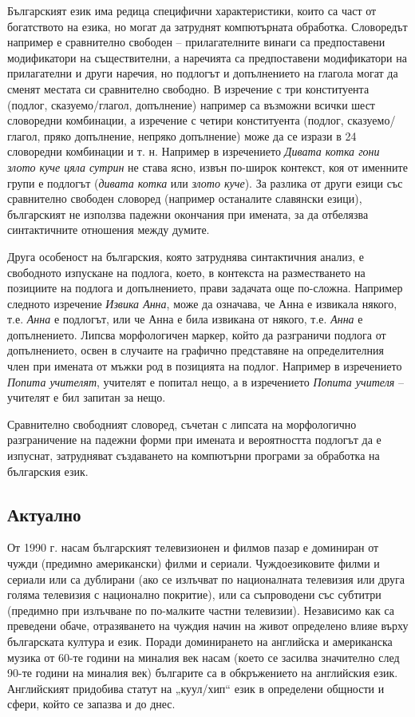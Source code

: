 \documentclass[]{../../metanetpaper}
\begin{document}
\begin{multicols}{2}
Българският език има редица специфични характеристики, които са част от богатството на езика, но могат
 да затруднят компютърната обработка. Словоредът например е
 сравнително свободен – прилагателните винаги са
 предпоставени модификатори на съществителни, а
 наречията
 са предпоставени
 модификатори
 на
 прилагателни и други наречия, но подлогът и
 допълнението на глагола могат да сменят местата си
 сравнително свободно. В изречение с три конституента
 (подлог, сказуемо/глагол, допълнение) например са
 възможни всички шест словоредни комбинации, а
 изречение
 с четири
 конституента
 (подлог,
 сказуемо/глагол,
 пряко допълнение,
 непряко
 допълнение) може да се изрази в 24 словоредни
 комбинации и т. н. Например в изречението \textit{Дивата
 котка гони злото куче цяла сутрин} не става ясно, извън
 по-широк контекст, коя от именните групи е подлогът
 (\textit{дивата котка} или  \textit{злото куче}). За разлика от други езици
 със сравнително свободен
 словоред
 (например
 останалите славянски езици), българският не използва
 падежни окончания при имената, за да отбелязва
 синтактичните отношения между думите.

Друга особеност на българския, която затруднява синтактичния анализ, е свободното изпускане на подлога, което, в контекста на разместването на позициите на подлога и допълнението, прави задачата
 още по-сложна. Например следното
 изречение \textit{Извика Анна}, може да означава, че
 Анна е извикала някого, т.е.  \textit{Анна} е подлогът, или че
 Анна е била извикана от някого, т.е.  \textit{Анна} е
 допълнението. Липсва морфологичен маркер, който да
 разграничи подлога от допълнението, освен в случаите
 на графично представяне на определителния член при имената от мъжки род в позицията на подлог. Например
 в изречението \textit{Попита учителят}, учителят е попитал
 нещо, а в изречението \textit{Попита учителя} – учителят е бил
 запитан за нещо.
 
Сравнително свободният словоред, съчетан с липсата на
 морфологично разграничение на падежни форми при
 имената и вероятността подлогът да е изпуснат, затрудняват създаването на компютърни програми за обработка на българския език.

\subsection{Актуално}

От 1990 г. насам българският телевизионен и филмов пазар е доминиран от чужди (предимно американски) филми и сериали. Чуждоезиковите филми и сериали или са дублирани (ако
 се излъчват по националната телевизия или друга
 голяма телевизия с национално покритие), или са
 съпроводени със субтитри (предимно при излъчване по
 по-малките частни телевизии). Независимо как са
 преведени обаче, отразяването на чуждия начин на живот
 определено влияе върху българската култура и
 език. Поради
 доминирането
 на
 английска и американска музика от 60-те години на миналия век насам (което се засилва значително след
 90-те години на миналия век) българите
са в обкръжението на английския език.
 Английският придобива статут на „куул/хип“
 език в определени общности и сфери, който се запазва и до днес. 


\end{multicols}
\end{document}
